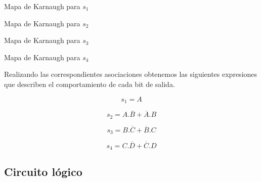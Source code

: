 \begin{center}

    \begin{Karnaugh}\label{Karnaugh_s1}
    \end{Karnaugh}

Mapa de Karnaugh para $s_1$

\begin{Karnaugh}\label{Karnaugh_s2}
    \end{Karnaugh}

Mapa de Karnaugh para $s_2$

\begin{Karnaugh}\label{Karnaugh_s3}
     \end{Karnaugh}

Mapa de Karnaugh para $s_3$

\begin{Karnaugh}\label{Karnaugh_s4}
    \end{Karnaugh}

Mapa de Karnaugh para $s_4$
\end{center}
Realizando las correspondientes asociaciones obtenemos las siguientes expresiones que describen el comportamiento de cada bit de salida.

\begin{equation}\label{s1_Karnaugh}
    s_{1}= A
\end{equation}

\begin{equation}\label{s2_Karnaugh}
    s_{2}= A.\overline{B}+\overline{A}.B
\end{equation}

\begin{equation}\label{s3_Karnaugh}
    s_{3}= B.\overline{C}+\overline{B}.C
\end{equation}

\begin{equation}\label{s4_Karnaugh}
    s_{4}= C.\overline{D}+\overline{C}.D
\end{equation}

\subsection{Circuito l\'ogico}\label{ej2_circ}

